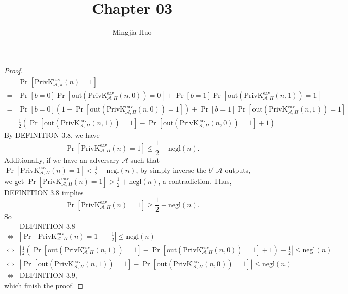 \documentclass[12pt]{article}
\newcommand{\privk}{\text{PrivK}}
\newcommand{\eav}{\text{eav}}
\newcommand{\out}{\text{out}}
\newcommand{\negl}{\text{negl}}
\newcommand{\A}{\mathcal{A}}
\newenvironment{problem}[2][Problem]{\begin{trivlist}
\item[\hskip \labelsep {\bfseries #1}\hskip \labelsep {\bfseries #2.}]}{\end{trivlist}}
\begin{document}
 
\title{Chapter 03}
\author{Mingjia Huo}
\date{}
\maketitle

\begin{problem}{3.4}
\begin{proof}
\begin{align*}
    &\Pr[\privk_{\A,\pi}^{\eav}(n)=1]\\
    =&\Pr[b=0]\Pr[\out(\privk_{\A,\Pi}^{\eav}(n,0))=0]+\Pr[b=1]\Pr[\out(\privk_{\A,\Pi}^{\eav}(n,1))=1]\\
    =&\Pr[b=0](1-\Pr[\out(\privk_{\A,\Pi}^{\eav}(n,0))=1])+\Pr[b=1]\Pr[\out(\privk_{\A,\Pi}^{\eav}(n,1))=1]\\
    =&\frac12(\Pr[\out(\privk_{\A,\Pi}^{\eav}(n,1))=1]-\Pr[\out(\privk_{\A,\Pi}^{\eav}(n,0))=1]+1)
\end{align*}
By DEFINITION 3.8, we have
\[ \Pr[\privk_{\A,\Pi}^{\eav}(n)=1]\le\frac12+\negl(n). \]
Additionally, if we have an adversary $\A$ such that $\Pr[\privk_{\A,\Pi}^{\eav}(n)=1]<\frac12-\negl(n)$, by simply inverse the $b'$ $\A$ outputs, we get $\Pr[\privk_{\A,\Pi}^{\eav}(n)=1]>\frac12+\negl(n)$, a contradiction. Thus, DEFINITION 3.8 implies 
$$\Pr[\privk_{\A,\Pi}^{\eav}(n)=1]\ge\frac12-\negl(n).$$
So 
\begin{align*}
    &\text{DEFINITION 3.8}\\
    \Leftrightarrow&\left|\Pr[\privk_{\A,\Pi}^{\eav}(n)=1]-\frac12\right|\le\negl(n)\\
    \Leftrightarrow&\left|\frac12\left(\Pr[\out(\privk_{\A,\Pi}^{\eav}(n,1))=1]-\Pr[\out(\privk_{\A,\Pi}^{\eav}(n,0))=1]+1\right)-\frac12\right|\le\negl(n)\\
    \Leftrightarrow&\left|\Pr[\out(\privk_{\A,\Pi}^{\eav}(n,1))=1]-\Pr[\out(\privk_{\A,\Pi}^{\eav}(n,0))=1]\right|\le\negl(n)\\
    \Leftrightarrow&\text{DEFINITION 3.9},
\end{align*}
which finish the proof.
\end{proof}
\end{problem}
\end{document}
